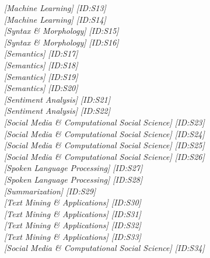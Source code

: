 \hfill \textit{[Machine Learning]  [ID:S13]} \\ 
\hfill \textit{[Machine Learning]  [ID:S14]} \\ 
\hfill \textit{[Syntax \& Morphology]  [ID:S15]} \\ 
\hfill \textit{[Syntax \& Morphology]  [ID:S16]} \\ 
\hfill \textit{[Semantics]  [ID:S17]} \\ 
\hfill \textit{[Semantics]  [ID:S18]} \\ 
\hfill \textit{[Semantics]  [ID:S19]} \\ 
\hfill \textit{[Semantics]  [ID:S20]} \\ 
\hfill \textit{[Sentiment Analysis]  [ID:S21]} \\ 
\hfill \textit{[Sentiment Analysis]  [ID:S22]} \\ 
\hfill \textit{[Social Media \& Computational Social Science]  [ID:S23]} \\ 
\hfill \textit{[Social Media \& Computational Social Science]  [ID:S24]} \\ 
\hfill \textit{[Social Media \& Computational Social Science]  [ID:S25]} \\ 
\hfill \textit{[Social Media \& Computational Social Science]  [ID:S26]} \\ 
\hfill \textit{[Spoken Language Processing]  [ID:S27]} \\ 
\hfill \textit{[Spoken Language Processing]  [ID:S28]} \\ 
\hfill \textit{[Summarization]  [ID:S29]} \\ 
\hfill \textit{[Text Mining \& Applications]  [ID:S30]} \\ 
\hfill \textit{[Text Mining \& Applications]  [ID:S31]} \\ 
\hfill \textit{[Text Mining \& Applications]  [ID:S32]} \\ 
\hfill \textit{[Text Mining \& Applications]  [ID:S33]} \\ 
\hfill \textit{[Social Media \& Computational Social Science]  [ID:S34]} \\ 
